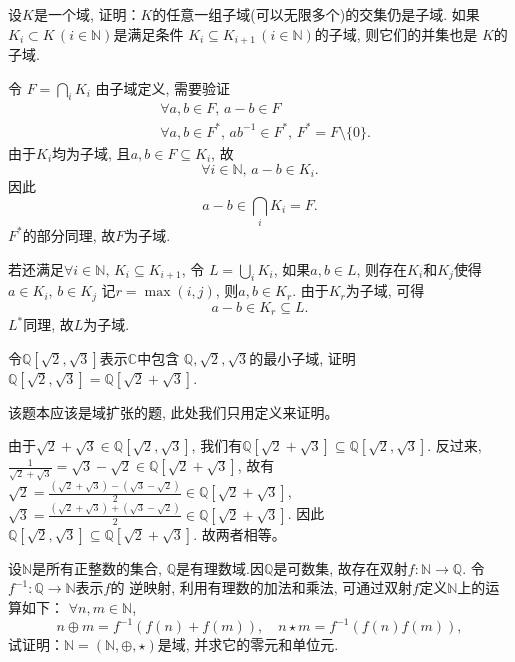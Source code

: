 \begin{problem}
    设$K$是一个域, 证明：$K$的任意一组子域(可以无限多个)的交集仍是子域.
如果$K_i \subset K \, (i \in \mathbb{N})$是满足条件
$K_i \subseteq K_{i+1} \, (i \in \mathbb{N})$的子域, 则它们的并集也是
$K$的子域.
\end{problem}

\begin{solution}
    令
\(
    F = \bigcap_i K_i
\)
    由子域定义, 需要验证
\[
\begin{aligned}
    &\forall a, b \in F ,\, a - b \in F\\
    &\forall a, b \in F^* ,\, ab^{-1} \in F^*,\, F^* = F \setminus \{0\}.
\end{aligned}
\]
由于$K_i$均为子域, 且$a, b \in F \subseteq K_i$, 故
\[
    \forall i \in \mathbb{N}, \, a - b \in K_i.
\]
因此
\[
    a - b \in \bigcap_i K_i = F.
\]
$F^*$的部分同理, 故$F$为子域.

若还满足$\forall i \in \mathbb{N} ,\, K_i \subseteq K_{i + 1}$,
令
\(
    L = \bigcup_i K_i
\),
如果$a, b \in L$, 则存在$K_i$和$K_j$使得$a \in K_i ,\, b \in K_j$
记$r = \max(i, j)$, 则$a, b \in K_r$. 由于$K_r$为子域, 可得
\[
    a - b \in K_r \subseteq L.
\]
$L^*$同理, 故$L$为子域.
\end{solution}

\begin{problem}
    令$\mathbb{Q}[\sqrt{2}, \sqrt{3}]$表示$\mathbb{C}$中包含
$\mathbb{Q}, \sqrt{2}, \sqrt{3}$的最小子域, 证明
$\mathbb{Q}[\sqrt{2}, \sqrt{3}] = \mathbb{Q}[\sqrt{2} + \sqrt{3}]$.
\end{problem}

\begin{solution}
    该题本应该是域扩张的题, 此处我们只用定义来证明。

    由于$\sqrt{2} + \sqrt{3} \in \mathbb{Q}[\sqrt{2}, \sqrt{3}]$,
我们有$\mathbb{Q}[\sqrt{2} + \sqrt{3}] \subseteq \mathbb{Q}[\sqrt{2}, \sqrt{3}]$.
反过来, 
\(
    \frac{1}{\sqrt{2} + \sqrt{3}} = \sqrt{3} - \sqrt{2} \in \mathbb{Q}[\sqrt{2} + \sqrt{3}]
\),
故有
\(
    \sqrt{2} = \frac{(\sqrt{2} + \sqrt{3}) - (\sqrt{3} - \sqrt{2})}{2} \in \mathbb{Q}[\sqrt{2} + \sqrt{3}]
\),
\(
    \sqrt{3} = \frac{(\sqrt{2} + \sqrt{3}) + (\sqrt{3} - \sqrt{2})}{2} \in \mathbb{Q}[\sqrt{2} + \sqrt{3}]
\).
因此
\(
    \mathbb{Q}[\sqrt{2}, \sqrt{3}] \subseteq \mathbb{Q}[\sqrt{2} + \sqrt{3}]
\).
故两者相等。
\end{solution}

\begin{problem}\label{ex:1.1.4}
    设$\mathbb{N}$是所有正整数的集合, $\mathbb{Q}$是有理数域.因$\mathbb{Q}$是可数集, 
故存在双射$f:\mathbb{N} \to \mathbb{Q}$. 令$f^{-1}:\mathbb{Q} \to \mathbb{N}$表示$f$的
逆映射, 利用有理数的加法和乘法, 可通过双射$f$定义$\mathbb{N}$上的运算如下：
$\forall n, m \in \mathbb{N}$, 
\[
    n \oplus m = f^{-1}(f(n) + f(m)), \quad n \star m = f^{-1}(f(n)f(m)),
\]
试证明：$\mathbb{N} = (\mathbb{N}, \oplus, \star)$是域, 并求它的零元和单位元.
\end{problem}

